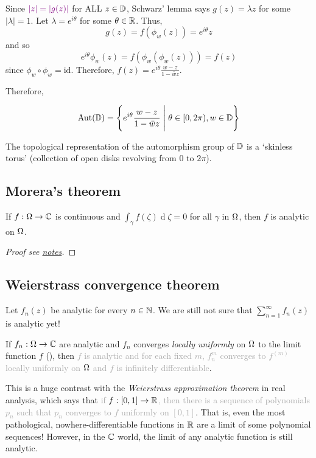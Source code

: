 \documentclass[12pt]{article}
\renewcommand{\d}{\ensuremath{\operatorname{d}}}
\begin{document}
Since $\textcolor{violet}{|z|=|g(z)|}$ for ALL $z\in \mathbb{D}$, Schwarz' lemma says $g(z)=\lambda z$ for some $|\lambda|=1$. Let $\lambda=e^{i\theta}$ for some $\theta\in \mathbb{R}$. Thus, \[g(z)=f(\phi_w(z))=e^{i\theta}z\]
and so \[e^{i\theta}\phi_w(z)=f(\phi_w(\phi_w(z)))=f(z)\]
since $\phi_w\circ \phi_w=\mathrm{id}$. Therefore, $\displaystyle f(z)=e^{i\theta}\frac{w-z}{1-\bar wz}$.

Therefore, 
\begin{proposition}
    \[\operatorname{Aut} (\mathbb{D})= \left\{e^{i\theta}\frac{w-z}{1-\bar wz}\; \Bigg \vert\; \theta\in [0,2\pi), w\in \mathbb{D}\right\}\]
\end{proposition}

\rmk The topological representation of the automorphism group of $\mathbb{D}$ is a `skinless torus' (collection of open disks revolving from 0 to $2\pi$).

\subsection{Morera's theorem}
\begin{theorem}[Morera]
    If $f:\Omega\to\mathbb{C}$ is continuous and $\int_{\gamma}f(\zeta)\d\zeta=0$ for all \underline{\hspace{2cm}} $\gamma$ in $\Omega$, then $f$ is analytic on $\Omega$. 
\end{theorem}
\begin{proof}[Proof see \href{https://stephangarcia.sites.pomona.edu/teaching/24S-135/Lecture/24S-135-Lecture16.pdf}{notes}]
\end{proof}

\subsection{Weierstrass convergence theorem}
Let $f_n(z)$ be analytic for every $n\in \mathbb{N}$. We are still not sure that $\sum_{n=1}^{\infty} f_n(z)$ is analytic yet!

\begin{theorem}
    If $f_n:\Omega\to \mathbb{C}$ are analytic and $f_n$ converges \textit{locally uniformly} on $\Omega$ to the limit function $f$ (), then \textcolor{darkgray}{$f$ is analytic and for each fixed $m$, $f_n^{m}$ converges to $f^{(m)}$ locally uniformly on $\Omega$ and $f$ is infinitely differentiable}. 
\end{theorem}

\rmk This is a huge contrast with the\textit{ Weierstrass approximation theorem} in real analysis, which says that \textcolor{darkgray}{if $f:[0,1]\to \mathbb{R}$, then there is a sequence of polynomials $p_n$ such that $p_n$ converges to $f$ uniformly on $[0,1]$}. That is, even the most pathological, nowhere-differentiable functions in $\mathbb{R}$ are a limit of some polynomial sequences! However, in the $\mathbb{C}$ world, the limit of any analytic function is still analytic.
\end{document}
